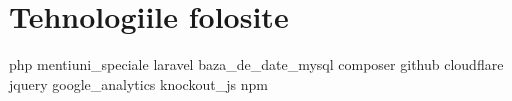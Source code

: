 \chapter{Tehnologiile folosite}
{php}
{mentiuni_speciale}
{laravel}
{baza_de_date_mysql}
{composer}
{github}
{cloudflare}
{jquery}
{google_analytics}
{knockout_js}
{npm}